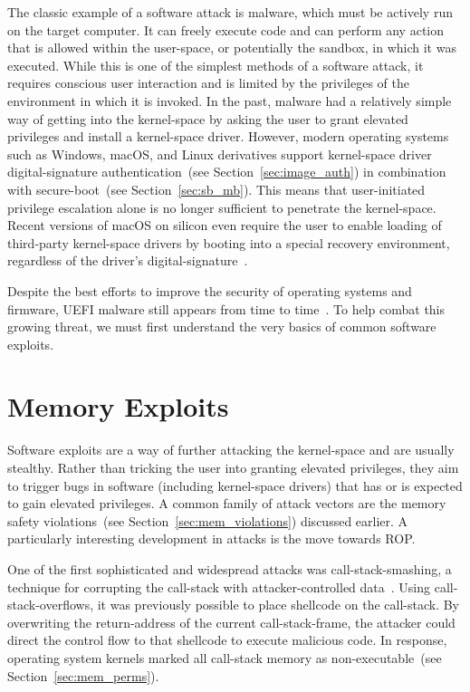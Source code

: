 The classic example of a software attack is malware, which must be actively run on the target computer. It can freely execute code and can perform any action that is allowed within the \gls{user-space}, or potentially the sandbox, in which it was executed. While this is one of the simplest methods of a software attack, it requires conscious user interaction and is limited by the privileges of the environment in which it is invoked. In the past, malware had a relatively simple way of getting into the \gls{kernel-space} by asking the user to grant elevated privileges and install a \gls{kernel-space} driver. However, modern operating systems such as Windows, macOS, and Linux derivatives support \gls{kernel-space} driver \gls{digital-signature} authentication~(see Section~\ref{sec:image_auth}) in combination with \gls{secure-boot}~(see Section~\ref{sec:sb_mb}). This means that user-initiated privilege escalation alone is no longer sufficient to penetrate the \gls{kernel-space}. Recent versions of macOS on  silicon even require the user to enable loading of third-party \gls{kernel-space} drivers by booting into a special recovery environment, regardless of the driver's \gls{digital-signature}~\cite{macOS-security-settings}.

Despite the best efforts to improve the security of operating systems and firmware, \gls{UEFI} malware still appears from time to time~\cite{eset-lojax,blacklotus}. To help combat this growing threat, we must first understand the very basics of common software exploits.

\section{Memory Exploits}
\label{sec:mem_exploits}

Software exploits are a way of further attacking the \gls{kernel-space} and are usually stealthy. Rather than tricking the user into granting elevated privileges, they aim to trigger bugs in software (including \gls{kernel-space} drivers) that has or is expected to gain elevated privileges. A common family of attack vectors are the memory safety violations~(see Section~\ref{sec:mem_violations}) discussed earlier. A particularly interesting development in attacks is the move towards \gls{ROP}.

One of the first sophisticated and widespread attacks was \gls{call-stack-smashing}, a technique for corrupting the \gls{call-stack} with attacker-controlled data~\cite{10.1007/978-3-642-33338-5_5}. Using \glspl{call-stack-overflow}, it was previously possible to place \gls{shellcode} on the \gls{call-stack}. By overwriting the \gls{return-address} of the current \gls{call-stack-frame}, the attacker could direct the control flow to that \gls{shellcode} to execute malicious code. In response, operating system kernels marked all \gls{call-stack} memory as non-executable~(see Section~\ref{sec:mem_perms}).

